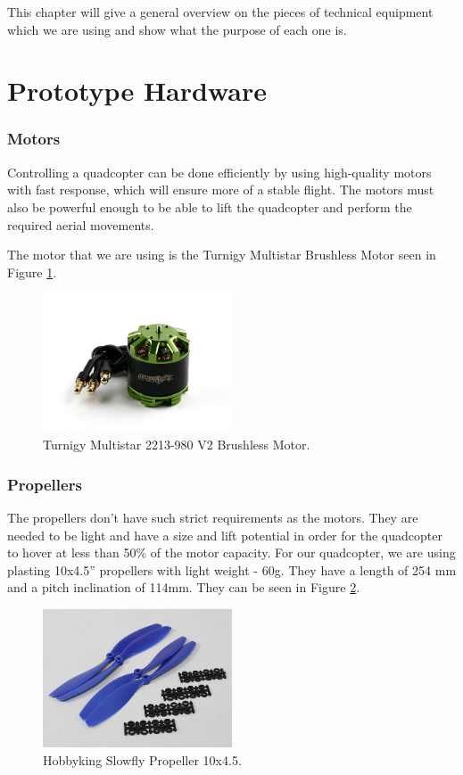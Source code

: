 This chapter will give a general overview on the pieces of technical equipment which we are using and show what the purpose of each one is.

\section{Prototype Hardware}

\subsubsection{Motors}
Controlling a quadcopter can be done efficiently by using high-quality motors with fast response, which will ensure more of a stable flight. The motors must also be powerful enough to be able to lift the quadcopter and perform the required aerial movements. 

The motor that we are using is the Turnigy Multistar Brushless Motor seen in Figure \ref{motor}.

\begin{figure}[H]
  \centering
    \includegraphics[width=0.5\textwidth]{images/motor.jpg}
	\caption{Turnigy Multistar 2213-980 V2 Brushless Motor.}
	\label{motor}
\end{figure}

\subsubsection{Propellers}
The propellers don't have such strict requirements as the motors. They are needed to be light and have a size and lift potential in order for the quadcopter to hover at less than 50\% of the motor capacity. For our quadcopter, we are using plasting 10x4.5'' propellers with light weight - 60g. They have a length of 254 mm and a pitch inclination of 114mm. They can be seen in Figure \ref{propeller}.

\begin{figure}[H]
  \centering
    \includegraphics[width=0.5\textwidth]{images/propeller.jpg}
	\caption{Hobbyking Slowfly Propeller 10x4.5.}
	\label{propeller}
\end{figure}

